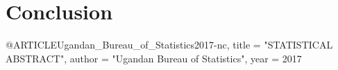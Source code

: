 \documentclass[12pt]{article} %
\begin{document}






\section{Conclusion} %

\lipsum[12-13]


\begin{thebibliography}{99} %

@ARTICLE{Ugandan_Bureau_of_Statistics2017-nc,
  title  = "{STATISTICAL} {ABSTRACT}",
  author = "{Ugandan Bureau of Statistics}",
  year   =  2017
}

\end{thebibliography}

\end{document}
